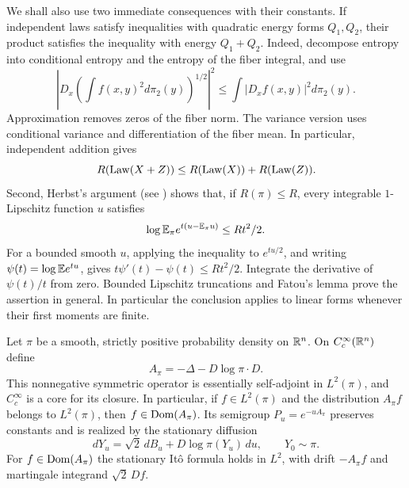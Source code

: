 We shall also use two immediate consequences with their constants.
If independent laws satisfy inequalities with quadratic energy
forms $Q_1,Q_2$, their product satisfies the inequality with energy
$Q_1+Q_2$. Indeed, decompose entropy into conditional entropy and
the entropy of the fiber integral, and use
\[
 \left|D_x\left(\int f(x,y)^2d\pi_2(y)\right)^{1/2}\right|^2
 \le\int|D_xf(x,y)|^2d\pi_2(y).
\]
Approximation removes zeros of the fiber norm. The variance version
uses conditional variance and differentiation of the fiber mean.
In particular, independent addition gives
\begin{equation}\label{eq:calculus-convolution}
 R(\operatorname{Law}(X+Z))\le R(\operatorname{Law}(X))+R(\operatorname{Law}(Z)).
\end{equation}
Second, Herbst's argument (see \cite[Section~2.3]{Ledoux1999})
shows that, if $R(\pi)\le R$, every integrable $1$-Lipschitz function
$u$ satisfies
\begin{equation}\label{eq:calculus-herbst}
 \log\mathbb E_\pi e^{t(u-\mathbb E_\pi u)}\le Rt^2/2.
\end{equation}
For a bounded smooth $u$, applying the inequality to $e^{tu/2}$,
and writing $\psi(t)=\log\mathbb E e^{tu}$, gives
$t\psi'(t)-\psi(t)\le Rt^2/2$. Integrate the derivative of
$\psi(t)/t$ from zero. Bounded Lipschitz truncations and Fatou's
lemma prove the assertion in general. In particular the conclusion
applies to linear forms whenever their first moments are finite.

\begin{lemma}
\label{lem:dirichlet-core}
Let $\pi$ be a smooth, strictly positive probability density on
$\mathbb R^n$. On $C_c^\infty(\mathbb R^n)$ define
\[
 A_\pi=-\Delta-D\log\pi\cdot D.
\]
This nonnegative symmetric operator is essentially self-adjoint in
$L^2(\pi)$, and $C_c^\infty$ is a core for its closure. In
particular, if $f\in L^2(\pi)$ and the distribution $A_\pi f$
belongs to $L^2(\pi)$, then $f\in\operatorname{Dom}(A_\pi)$. Its semigroup
$P_u=e^{-uA_\pi}$ preserves constants and is realized by the
stationary diffusion
\begin{equation}\label{eq:calculus-diffusion}
 dY_u=\sqrt2\,dB_u+D\log\pi(Y_u)\,du,
 \qquad Y_0\sim\pi.
\end{equation}
For $f\in\operatorname{Dom}(A_\pi)$ the stationary It\^o formula holds in $L^2$,
with drift $-A_\pi f$ and martingale integrand $\sqrt2\,Df$.
\end{lemma}

